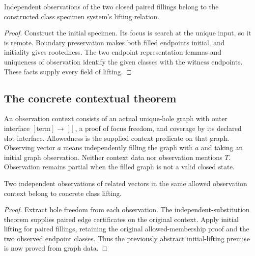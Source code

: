 \begin{theorem}
Independent observations of the two closed paired fillings belong to the constructed class specimen system's lifting relation.
\end{theorem}
\begin{proof}
Construct the initial specimen. Its focus is search at the unique input, so it is remote. Boundary preservation makes both filled endpoints initial, and initiality gives rootedness. The two endpoint representation lemmas and uniqueness of observation identify the given classes with the witness endpoints. These facts supply every field of lifting.
\end{proof}

\subsection{The concrete contextual theorem}
\begin{definition}
An observation context consists of an actual unique-hole graph with outer interface $[\mathrm{term}]\to[]$, a proof of focus freedom, and coverage by its declared slot interface. Allowedness is the supplied context predicate on that graph. Observing vector $a$ means independently filling the graph with $a$ and taking an initial graph observation. Neither context data nor observation mentions $T$. Observation remains partial when the filled graph is not a valid closed state.
\end{definition}

\begin{theorem}
Two independent observations of related vectors in the same allowed observation context belong to concrete class lifting.
\end{theorem}
\begin{proof}
Extract hole freedom from each observation. The independent-substitution theorem supplies paired edge certificates on the original context. Apply initial lifting for paired fillings, retaining the original allowed-membership proof and the two observed endpoint classes. Thus the previously abstract initial-lifting premise is now proved from graph data.
\end{proof}

